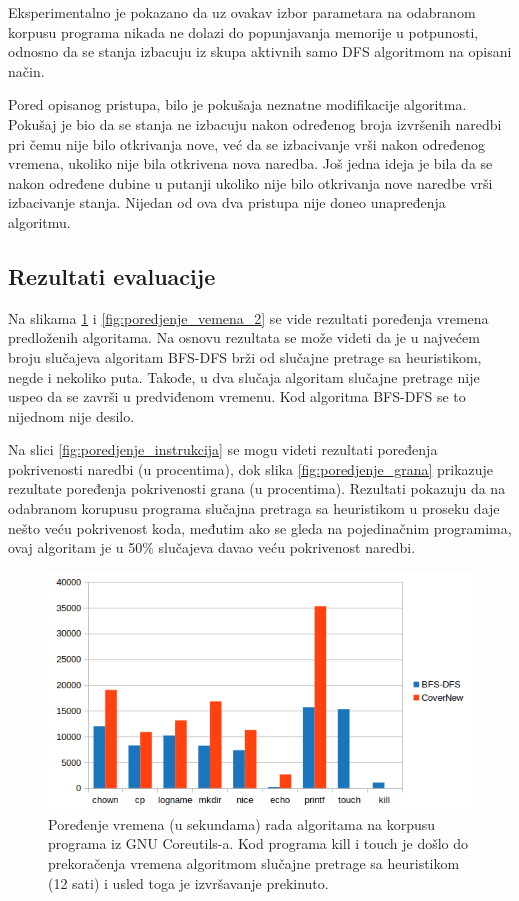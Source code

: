 \documentclass[12pt,oneside]{memoir}
\begin{document}
Eksperimentalno je pokazano da uz ovakav izbor parametara na odabranom korpusu programa nikada ne dolazi do popunjavanja memorije u potpunosti, odnosno da se stanja izbacuju iz skupa aktivnih samo DFS algoritmom na opisani način.

Pored opisanog pristupa, bilo je pokušaja neznatne modifikacije algoritma. Pokušaj je bio da se stanja ne izbacuju nakon određenog broja izvršenih naredbi pri čemu nije bilo otkrivanja nove, već da se izbacivanje vrši nakon određenog vremena, ukoliko nije bila otkrivena nova naredba. Još jedna ideja je bila da se nakon određene dubine u putanji ukoliko nije bilo otkrivanja nove naredbe vrši izbacivanje stanja. Nijedan od ova dva pristupa nije doneo unapređenja algoritmu.

\subsection{Rezultati evaluacije}

Na slikama \ref{fig:poredjenje_vemena_1} i \ref{fig:poredjenje_vemena_2} se vide rezultati poređenja vremena predloženih algoritama. Na osnovu rezultata se može videti da je u najvećem broju slučajeva algoritam BFS-DFS brži od slučajne pretrage sa heuristikom, negde i nekoliko puta. Takođe, u dva slučaja algoritam slučajne pretrage nije uspeo da se završi u predviđenom vremenu. Kod algoritma BFS-DFS se to nijednom nije desilo. 

Na slici \ref{fig:poredjenje_instrukcija} se mogu videti rezultati poređenja pokrivenosti naredbi (u procentima), dok slika \ref{fig:poredjenje_grana} prikazuje rezultate poređenja pokrivenosti grana (u procentima). Rezultati pokazuju da na odabranom korupusu programa slučajna pretraga sa heuristikom u proseku daje nešto veću pokrivenost koda, međutim ako se gleda na pojedinačnim programima, ovaj algoritam je u 50\% slučajeva davao veću pokrivenost naredbi.

\begin{figure}[H]
    \centering
    \includegraphics[width=1.0\linewidth]{poredjenje_vremena_1.png}
    \caption{Poređenje vremena (u sekundama) rada algoritama na korpusu programa iz GNU Coreutils-a. Kod programa kill i touch je došlo do prekoračenja vremena algoritmom slučajne pretrage sa heuristikom (12 sati) i usled toga je izvršavanje prekinuto.}
    \label{fig:poredjenje_vemena_1}
\end{figure}
\end{document}
